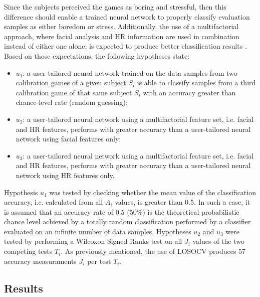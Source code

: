Since the subjects perceived the games as boring and stressful, then this difference should enable a trained neural network to properly classify evaluation samples as either boredom or stress. Additionally, the use of a multifactorial approach, where facial analysis and HR information are used in combination instead of either one alone, is expected to produce better classification results \parencite{zacharatos2014automatic}. Based on those expectations, the following hypotheses state:

\begin{itemize}
  \item $u_1$: a user-tailored neural network trained on the data samples from two calibration games of a given subject $S_i$ is able to classify samples from a third calibration game of that same subject $S_i$ with an accuracy greater than chance-level rate (random guessing);
  \item $u_2$: a user-tailored neural network using a multifactorial feature set, i.e. facial and HR features, performs with greater accuracy than a user-tailored neural network using facial features only;
  \item $u_3$: a user-tailored neural network using a multifactorial feature set, i.e. facial and HR features, performs with greater accuracy than a user-tailored neural network using HR features only.
\end{itemize}

Hypothesis $u_1$ was tested by checking whether the mean value of the classification accuracy, i.e. calculated from all $A_i$ values, is greater than 0.5. In such a case, it is assumed that an accuracy rate of 0.5 (50\%) is the theoretical probabilistic chance level achieved by a totally random classification performed by a classifier evaluated on an infinite number of data samples. Hypotheses $u_2$ and $u_3$ were tested by performing a Wilcoxon Signed Ranks test on all $J_i$ values of the two competing tests $T_i$. As previously mentioned, the use of LOSOCV produces 57 accuracy measuraments $J_i$ per test $T_i$.

\subsection{Results}

